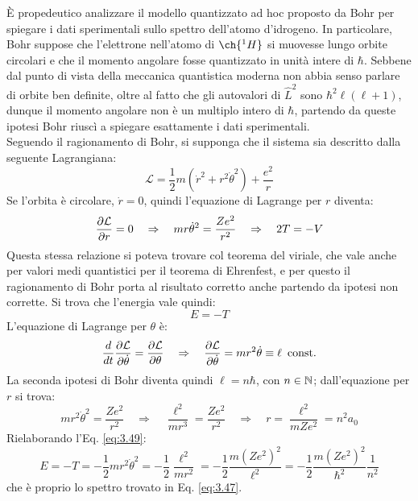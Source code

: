 È propedeutico analizzare il modello quantizzato ad hoc proposto da Bohr per spiegare i dati sperimentali sullo spettro dell'atomo d'idrogeno. In particolare, Bohr suppose che l'elettrone nell'atomo di $ \ch{^1H} $ si muovesse lungo orbite circolari e che il momento angolare fosse quantizzato in unità intere di $ \hbar $. Sebbene dal punto di vista della meccanica quantistica moderna non abbia senso parlare di orbite ben definite, oltre al fatto che gli autovalori di $ \hat{L}^2 $ sono $ \hbar^2 \ell (\ell + 1) $, dunque il momento angolare non è un multiplo intero di $ \hbar $, partendo da queste ipotesi Bohr riuscì a spiegare esattamente i dati sperimentali.\\
Seguendo il ragionamento di Bohr, si supponga che il sistema sia descritto dalla seguente Lagrangiana:
\begin{equation}
	\mathcal{L} = \frac{1}{2} m (\dot{r}^2 + r^2\dot{\theta}^2) + \frac{e^2}{r}
	\label{eq:3.48}
\end{equation}
Se l'orbita è circolare, $ \dot{r} = 0 $, quindi l'equazione di Lagrange per $ r $ diventa:
\begin{equation*}
	\frac{\partial \mathcal{L}}{\partial r} = 0 \quad \Rightarrow \quad mr \dot{\theta}^2 = \frac{Ze^2}{r^2} \quad \Rightarrow \quad 2T = -V
\end{equation*}
Questa stessa relazione si poteva trovare col teorema del viriale, che vale anche per valori medi quantistici per il teorema di Ehrenfest, e per questo il ragionamento di Bohr porta al risultato corretto anche partendo da ipotesi non corrette. Si trova che l'energia vale quindi:
\begin{equation}
	E = -T
	\label{eq:3.49}
\end{equation}
L'equazione di Lagrange per $ \theta $ è:
\begin{equation*}
	\frac{d}{dt} \frac{\partial \mathcal{L}}{\partial \dot{\theta}} = \frac{\partial \mathcal{L}}{\partial \theta} \quad \Rightarrow \quad \frac{\partial \mathcal{L}}{\partial \dot{\theta}} = mr^2 \dot{\theta} \equiv \ell \,\text{ const.}
\end{equation*}
La seconda ipotesi di Bohr diventa quindi $ \ell = n \hbar $, con $ n \in \mathbb{N} $; dall'equazione per $ r $ si trova:
\begin{equation*}
	mr^2 \dot{\theta}^2 = \frac{Ze^2}{r^2} \quad \Rightarrow \quad \frac{\ell^2}{mr^3} = \frac{Ze^2}{r^2} \quad \Rightarrow \quad r = \frac{\ell^2}{mZe^2} = n^2 a_0
\end{equation*}
Rielaborando l'Eq. \ref{eq:3.49}:
\begin{equation*}
	E = -T = -\frac{1}{2} m r^2 \dot{\theta}^2 = -\frac{1}{2} \frac{\ell^2}{mr^2} = -\frac{1}{2} \frac{m(Ze^2)^2}{\ell^2} = -\frac{1}{2} \frac{m (Ze^2)^2}{\hbar^2} \frac{1}{n^2}
\end{equation*}
che è proprio lo spettro trovato in Eq. \ref{eq:3.47}.

